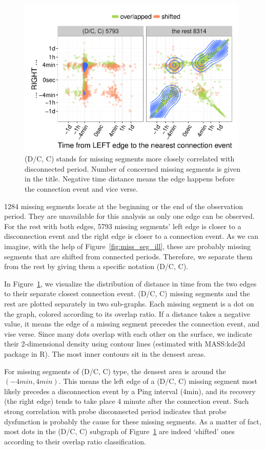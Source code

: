 \begin{figure}[!htb]
\centering
\includegraphics[width=0.98\textwidth]{gfx/chap3/all.pdf}
\caption{(D/C, C) stands for missing segments more closely correlated with disconnected period.
Number of concerned missing segments is given in the title. Negative time distance means the edge happens before the connection event and vice verse.}
\label{fig:all}
\end{figure}

1284 missing segments locate at the beginning or the end of the observation period. 
They are unavailable for this analysis as only one edge can be observed.
For the rest with both edges, 5793 missing segments' left edge is closer to a disconnection event and the right edge is closer to a connection event.
As we can imagine, with the help of Figure~\ref{fig:miss_seg_ill}, these are probably missing segments that are shifted from connected periods.
Therefore, we separate them from the rest by giving them a specific notation (D/C, C).

In Figure~\ref{fig:all}, we visualize the distribution of distance in time from the two edges to their separate closest connection event. 
(D/C, C) missing segments and the rest are plotted separately in two sub-graphs.
Each missing segment is a dot on the graph, colored according to its overlap ratio.
If a distance takes a negative value, it means the edge of a missing segment precedes the connection event, and vise verse.
Since many dots overlap with each other on the surface, we indicate their 2-dimensional density using contour lines (estimated with MASS:kde2d package in R). 
The most inner contours sit in the densest areas.

For missing segments of (D/C, C) type, the densest area is around the $(-4min, 4min)$. 
This means the left edge of a (D/C, C) missing segment most likely precedes a disconnection event by a Ping interval (4min), and its recovery (the right edge) tends to take place 4 minute after the connection event.
Such strong correlation with probe disconnected period indicates that probe dysfunction is probably the cause for these missing segments. 
As a matter of fact, most dots in the (D/C, C) subgraph of Figure~\ref{fig:all} are indeed `shifted' ones according to their overlap ratio classification.

